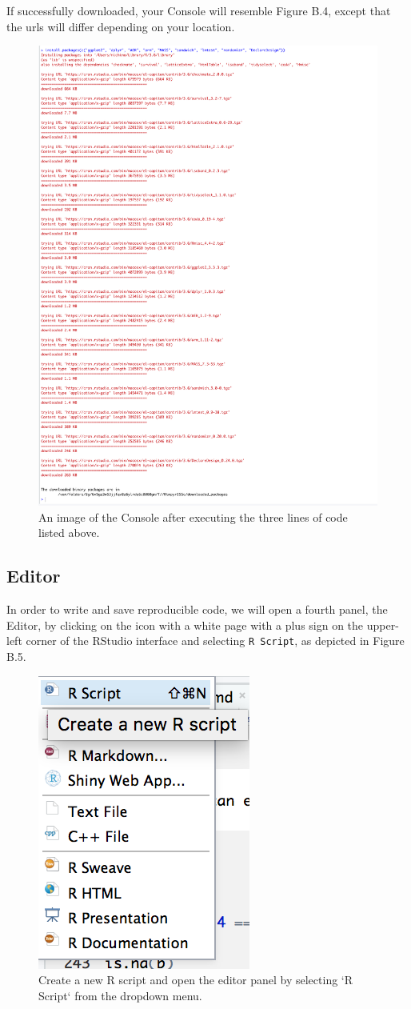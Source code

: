 \documentclass[12pt,]{book}
\begin{document}
If successfully downloaded, your Console will resemble Figure B.4, except that the urls will differ depending on your location.

\begin{figure}
\includegraphics[width=0.4\linewidth]{Images/console2a} \caption{An image of the Console after executing the three lines of code listed above.}\label{fig:console2}
\end{figure}

\hypertarget{editor}{%
\subsection{Editor}\label{editor}}

In order to write and save reproducible code, we will open a fourth panel, the Editor, by clicking on the icon with a white page with a plus sign on the upper-left corner of the RStudio interface and selecting \texttt{R\ Script}, as depicted in Figure B.5.

\begin{figure}
\includegraphics[width=0.6\linewidth]{Images/new_script} \caption{Create a new R script and open the editor panel by selecting `R Script` from the dropdown menu.}\label{fig:newscript}
\end{figure}
\end{document}
